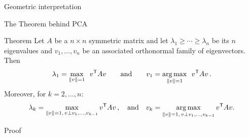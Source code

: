 \documentclass{beamer}
\begin{document}
\begin{frame}[t]{Geometric interpretation}
	\grid

\end{frame}

\begin{frame}[t]{The Theorem behind PCA}
	\grid

	\vspace{-0.3cm}
	\begin{block}{Theorem}
		Let $A$ be a $n \times n$ symmetric matrix and let $\lambda_1 \geq \cdots \geq \lambda_n$ be its $n$ eigenvalues and $v_1, \dots, v_n$ be an associated orthonormal family of eigenvectors. Then 
		$$
		\lambda_1 = \max_{\|v\| = 1}\ \, v^{{\sf T}} A v
		\qquad \text{and} \qquad
		v_1 = \operatorname*{arg\,max}_{\|v\| = 1}\ \, v^{{\sf T}} A v\,.
		$$
		Moreover, for $k=2,\dots,n$:
		$$
		\lambda_{k} = \max_{\|v\| = 1, \, v \perp v_1, \dots, v_{k-1}} v^{{\sf T}} A v\,,
		\quad \text{and} \quad
		v_{k} = \operatorname*{arg\,max}_{\|v\| = 1, \, v \perp v_1, \dots, v_{k-1}} v^{{\sf T}} A v.
		$$
	\end{block}
\end{frame}

\begin{frame}[t]{Proof}
	\grid

	\pause
	\pause
\end{frame}
\end{document}
